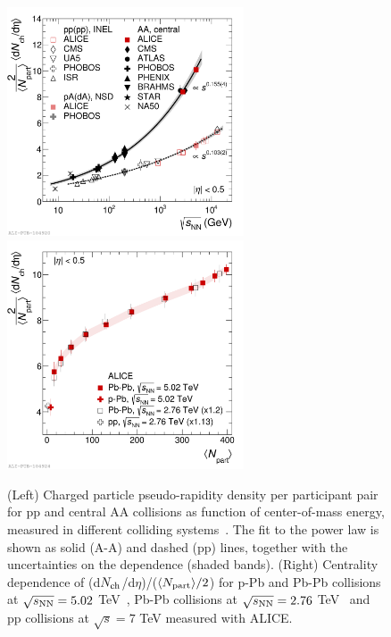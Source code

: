 \begin{figure}[!t]
  \centering
  \includegraphics[width=7cm]{FigCap1/dNchdEtaVsEnergy.pdf}
  \includegraphics[width=7cm]{FigCap1/dNchdEtaVsNpart.pdf}
  \caption{(Left) Charged particle pseudo-rapidity density per participant pair for pp and central AA collisions as function of center-of-mass energy, measured in different colliding systems~\cite{Adam:2015ptt}. The fit to the power law is shown as solid (A-A) and dashed (pp) lines, together with the uncertainties on the dependence (shaded bands). (Right) Centrality dependence of (d$N_{\rm ch}$/d$\eta$)/($\langle N_{\rm part} \rangle/2$) for p-Pb and Pb-Pb collisions at $\sqrt{s_{\rm NN}}=5.02$ TeV~\cite{ALICE:2012xs,Adam:2015gka}, Pb-Pb collisions at $\sqrt{s_{\rm NN}}=2.76$ TeV~\cite{Aamodt:2010cz} and pp collisions at $\sqrt{s}=7$ TeV measured with ALICE.}
  \label{fig:dNchdEta}
\end{figure}

